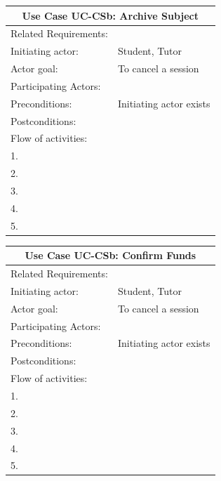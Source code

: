 \documentclass[12pt]{article}
\begin{document}
{		\begin{tabular}{| l | p{10cm}| }
			\hline\multicolumn{2}{|c|}{ \textbf{Use Case UC-CSb: Archive Subject } }\\ \hline
			Related Requirements: &  \\ \hline
			Initiating actor: & Student, Tutor \\ \hline
			Actor goal: & To cancel a session\\ \hline
			Participating Actors: \\ \hline
			Preconditions: &Initiating actor exists\\ \hline
			Postconditions: & \\ \hline
			\multicolumn{2}{|l|}{Flow of activities:}\\ \hline
			\multicolumn{2}{|p{15cm}|}{1. }\\
			\multicolumn{2}{|p{15cm}|}{2. }\\
			\multicolumn{2}{|l|}{3. }\\
			\multicolumn{2}{|l|}{4. }\\
			\multicolumn{2}{|l|}{5. }\\
			 \hline
		\end{tabular}

		\begin{tabular}{| l | p{10cm}| }
			\hline\multicolumn{2}{|c|}{ \textbf{Use Case UC-CSb: Confirm Funds } }\\ \hline
			Related Requirements: &  \\ \hline
			Initiating actor: & Student, Tutor \\ \hline
			Actor goal: & To cancel a session\\ \hline
			Participating Actors: \\ \hline
			Preconditions: &Initiating actor exists\\ \hline
			Postconditions: & \\ \hline
			\multicolumn{2}{|l|}{Flow of activities:}\\ \hline
			\multicolumn{2}{|p{15cm}|}{1. }\\
			\multicolumn{2}{|p{15cm}|}{2. }\\
			\multicolumn{2}{|l|}{3. }\\
			\multicolumn{2}{|l|}{4. }\\
			\multicolumn{2}{|l|}{5. }\\
			 \hline
		\end{tabular}

}
\end{document}
